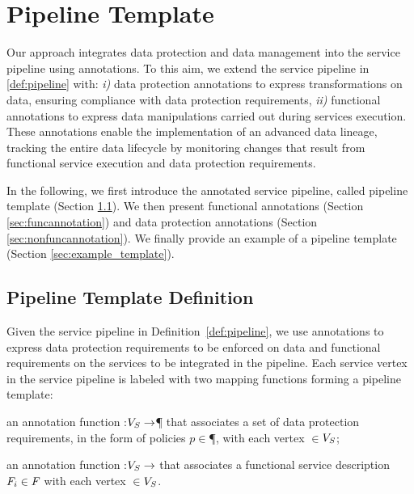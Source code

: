\section{Pipeline Template}\label{sec:template}
Our approach integrates data protection and data management into the service pipeline using annotations.
To this aim, we extend the service pipeline in \cref{def:pipeline} with: \emph{i)} data protection annotations to express transformations on data, ensuring compliance with data protection requirements, \emph{ii)} functional annotations to express data manipulations carried out during services execution.
These annotations enable the implementation of an advanced data lineage, tracking the entire data lifecycle by monitoring changes that result from functional service execution and data protection requirements.

In the following, we first introduce the annotated service pipeline, called pipeline template (Section \ref{sec:templatedefinition}). We then present functional annotations (Section \ref{sec:funcannotation}) and data protection annotations (Section \ref{sec:nonfuncannotation}). We finally provide an example of a pipeline template (Section \ref{sec:example_template}).


\subsection{Pipeline Template Definition}\label{sec:templatedefinition}
Given the service pipeline in Definition~\ref{def:pipeline}, we use annotations to express data protection requirements to be enforced on data and functional requirements on the services to be integrated in the pipeline. Each service vertex in the service pipeline is labeled with two mapping functions forming a pipeline template:
\begin{enumerate*}[label=\textit{\roman*})]
  \item an annotation function \myLambda:$V_S\rightarrow$\P{} that associates a set of data protection requirements, in the form of policies $p$$\in$\P{}, with each vertex $\in$$V_S$;
  \item an annotation function \myGamma:$V_S\rightarrow$\F{} that associates a functional service description $F_i\in F_{}$ with each vertex $\in$$V_S$.
\end{enumerate*}

